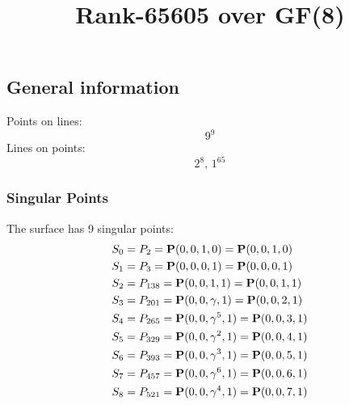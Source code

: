 \documentclass{article}
\newcommand\setTBstruts{\def\T{\rule{0pt}{2.6ex}}%
\def\B{\rule[-1.2ex]{0pt}{0pt}}}
\newcommand{\bP}{{\bf P}}
\begin{document}
 
\setTBstruts



{\allowdisplaybreaks%






\title{Rank-65605 over GF(8)}
\author{}%
\maketitle%
%
{}



\subsection*{General information}
Points on lines:
$$
9^9$$
Lines on points:
$$
2^8,\,1^{65}$$
\subsubsection*{Singular Points}
The surface has 9 singular points:\\
\begin{align*}
S_{0} &= P_{2}=\bP(0, 0, 1, 0) = \bP(0, 0, 1, 0)\\
S_{1} &= P_{3}=\bP(0, 0, 0, 1) = \bP(0, 0, 0, 1)\\
S_{2} &= P_{138}=\bP(0, 0, 1, 1) = \bP(0, 0, 1, 1)\\
S_{3} &= P_{201}=\bP(0, 0, \gamma , 1) = \bP(0, 0, 2, 1)\\
S_{4} &= P_{265}=\bP(0, 0, \gamma^{5}, 1) = \bP(0, 0, 3, 1)\\
S_{5} &= P_{329}=\bP(0, 0, \gamma^{2}, 1) = \bP(0, 0, 4, 1)\\
S_{6} &= P_{393}=\bP(0, 0, \gamma^{3}, 1) = \bP(0, 0, 5, 1)\\
S_{7} &= P_{457}=\bP(0, 0, \gamma^{6}, 1) = \bP(0, 0, 6, 1)\\
S_{8} &= P_{521}=\bP(0, 0, \gamma^{4}, 1) = \bP(0, 0, 7, 1)\\
\end{align*}
}
\end{document}
